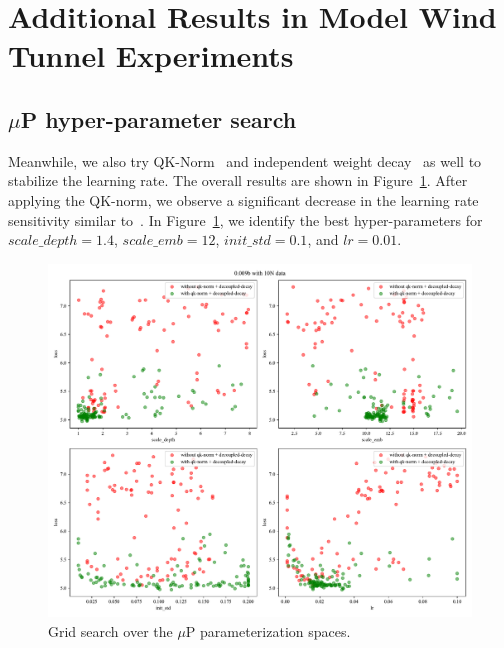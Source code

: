 \section{Additional Results in Model Wind Tunnel Experiments}

\subsection{$\mu$P hyper-parameter search}
\label{app:bayesiansearch}
Meanwhile, we also try QK-Norm~\citep{henry-etal-2020-query} and independent weight decay~\citep{loshchilov2017decoupled} as well to stabilize the learning rate. The overall results are shown in Figure~\ref{fig:mupsearch_app}. After applying the QK-norm, we observe a significant decrease in the learning rate sensitivity similar to~\cite{wortsman2023small}. In Figure~\ref{fig:mupsearch_app}, we identify the best hyper-parameters for $scale\_depth=1.4$, $scale\_emb=12$, $init\_std=0.1$, and $lr=0.01$. 

\begin{figure}[htbp]
    \centering
    \includegraphics[width=0.65\linewidth]{Fig/mup0.009bwith10Ndata.pdf}
    \caption{Grid search over the $\mu$P parameterization spaces.}
    \label{fig:mupsearch_app}
\end{figure}

